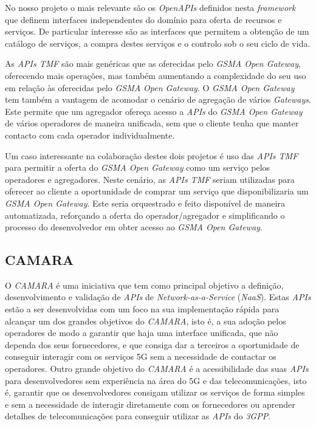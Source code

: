 No nosso projeto o mais relevante são os \emph{OpenAPIs} definidos nesta
\emph{framework} que definem interfaces independentes do domínio para oferta de
recursos e serviços. De particular interesse são as interfaces que permitem a
obtenção de um catálogo de serviços, a compra destes serviços e o controlo sob
o seu ciclo de vida.

As \emph{APIs TMF} são mais genéricas que as oferecidas pelo \emph{GSMA Open
	Gateway}, oferecendo mais operações, mas também aumentando a complexidade do
seu uso em relação às oferecidas pelo \emph{GSMA Open Gateway}. O \emph{GSMA
	Open Gateway} tem também a vantagem de acomodar o cenário de agregação de
vários \emph{Gateways}. Este permite que um agregador ofereça acesso a
\emph{APIs} do \emph{GSMA Open Gateway} de vários operadores de maneira
unificada, sem que o cliente tenha que manter contacto com cada operador
individualmente.

Um caso interessante na colaboração destes dois projetos é uso das \emph{APIs
	TMF} para permitir a oferta do \emph{GSMA Open Gateway} como um serviço pelos
operadores e agregadores. Neste cenário, as \emph{APIs TMF} seriam utilizadas
para oferecer ao cliente a oportunidade de comprar um serviço que
disponibilizaria um \emph{GSMA Open Gateway}. Este seria orquestrado e feito
disponível de maneira automatizada, reforçando a oferta do operador/agregador e
simplificando o processo do desenvolvedor em obter acesso ao \emph{GSMA Open
	Gateway}.

\subsection{CAMARA}

O \emph{CAMARA} é uma iniciativa que tem como principal objetivo a definição,
desenvolvimento e validação de \emph{APIs} de \emph{Network-as-a-Service}
(\emph{NaaS})\cite{10.1145/3538401.3546825}. Estas \emph{APIs} estão a ser
desenvolvidas com um foco na sua implementação rápida para alcançar um dos
grandes objetivos do \emph{CAMARA}, isto é, a sua adoção pelos operadores de
modo a garantir que haja uma interface unificada, que não dependa dos seus
fornecedores, e que consiga dar a terceiros a oportunidade de conseguir
interagir com os serviços 5G sem a necessidade de contactar os operadores.
Outro grande objetivo do \emph{CAMARA} é a acessibilidade das suas \emph{APIs}
para desenvolvedores sem experiência na área do 5G e das telecomunicações, isto
é, garantir que os desenvolvedores consigam utilizar os serviços de forma
simples e sem a necessidade de interagir diretamente com os fornecedores ou
aprender detalhes de telecomunicações para conseguir utilizar as \emph{APIs} do
\emph{3GPP}.

